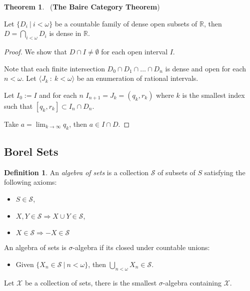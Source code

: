 \documentclass[8pt]{article}
\theoremstyle{definition}
\newtheorem{definition}{Definition}[section]
\theoremstyle{definition}
\newtheorem{theorem}{Theorem}[section]
\theoremstyle{definition}
\theoremstyle{definition}
\theoremstyle{definition}
\theoremstyle{definition}
\theoremstyle{definition}
\theoremstyle{definition}
\theoremstyle{definition}
\theoremstyle{definition}
\theoremstyle{definition}
\theoremstyle{definition}
\theoremstyle{definition}
\theoremstyle{definition}
\theoremstyle{question}
\begin{document}
\begin{theorem}~\label{baire:category} ({\bf The Baire Category Theorem})

  Let $\{ D_i \: | \: i < \omega \}$ be a countable family of dense open subsets of $\mathbb{R}$, then
  $D = \bigcap \limits_{i < \omega} D_i$ is dense in $\mathbb{R}$.
\end{theorem}

\begin{proof}
  We show that $D \cap I \neq \emptyset$ for each open interval $I$.

  Note that each finite intersection $D_0 \cap D_1 \cap \dots \cap D_n$ is dense and open for each $n < \omega$.
  Let $\langle J_k \: : \: k < \omega \rangle$ be an enumeration of rational intervals.
  
  Let $I_0 := I$ and for each $n$ $I_{n + 1} = J_k = (q_k, r_k)$ 
  where $k$ is the smallest index such that $[q_k, r_k] \subset I_n \cap D_n$.

  Take $a = \lim_{k \to \infty} q_k$, then $a \in I \cap D$.
\end{proof}

\subsection{Borel Sets}

\begin{definition}
  An \emph{algebra of sets} is a collection $\mathcal{S}$ of subsets of $S$ satisfying the following axioms:
  \begin{itemize}
    \item $S \in \mathcal{S}$,
    \item $X, Y \in \mathcal{S} \Rightarrow X \cup Y \in \mathcal{S}$,
    \item $X \in \mathcal{S} \Rightarrow -X \in \mathcal{S}$
  \end{itemize}

  An algebra of sets is {$\sigma$-algebra} if its closed under countable unions:
  \begin{itemize}
    \item Given $\{ X_n \in \mathcal{S} \: | \: n < \omega \}$, then $\bigcup \limits_{n < \omega} X_n 
    \in \mathcal{S}$.
  \end{itemize}
\end{definition}

Let $\mathcal{X}$ be a collection of sets, there is the smallest $\sigma$-algebra containing $\mathcal{X}$.
\end{document}
